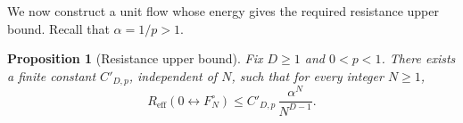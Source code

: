 \documentclass[conference]{IEEEtran}
\DeclareRobustCommand{\revtwoadd}[1]{{\color{revisionmaroon}#1}}
\newtheorem{proposition}{Proposition}
\newcommand{\Z}{\mathbb{Z}}
\begin{document}



We now construct a unit flow whose energy gives the required
resistance upper bound. Recall that $\alpha=1/p>1$.

\begin{proposition}[Resistance upper bound]
\label{prop:resistance-upper}
Fix $D\ge1$ and $0<p<1$. There exists a finite constant
$C'_{D,p}$, independent of $N$, such that for every integer $N\ge1$,
\begin{equation}
\label{eq:Reff-upper}
R_{\mathrm{eff}}(0 \leftrightarrow F_N^\circ)
\le C'_{D,p}\,\frac{\alpha^N}{N^{D-1}}.
\end{equation}
\end{proposition}
\end{document}
